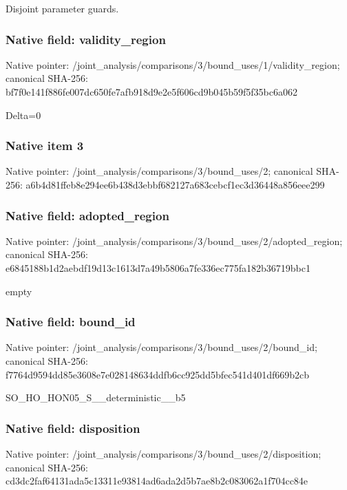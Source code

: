\documentclass[10pt,a4paper]{article}
\begin{document}
\begingroup\raggedright\sloppy Disjoint parameter guards.\par\endgroup

\subsubsection{Native field: validity\_\allowbreak{}region}
Native pointer: /joint\_\allowbreak{}analysis/comparisons/3/bound\_\allowbreak{}uses/1/validity\_\allowbreak{}region; canonical SHA-256: bf7f0e141f886fe007dc650fe7afb918d9e2e5f606cd9b045b59f5f35bc6a062

\begingroup\raggedright\sloppy Delta=\allowbreak{}0\par\endgroup

\subsubsection{Native item 3}
Native pointer: /joint\_\allowbreak{}analysis/comparisons/3/bound\_\allowbreak{}uses/2; canonical SHA-256: a6b4d81ffeb8e294ee6b438d3ebbf682127a683cebcf1ec3d36448a856eee299

\subsubsection{Native field: adopted\_\allowbreak{}region}
Native pointer: /joint\_\allowbreak{}analysis/comparisons/3/bound\_\allowbreak{}uses/2/adopted\_\allowbreak{}region; canonical SHA-256: e6845188b1d2aebdf19d13c1613d7a49b5806a7fe336ec775fa182b36719bbc1

\begingroup\raggedright\sloppy empty\par\endgroup

\subsubsection{Native field: bound\_\allowbreak{}id}
Native pointer: /joint\_\allowbreak{}analysis/comparisons/3/bound\_\allowbreak{}uses/2/bound\_\allowbreak{}id; canonical SHA-256: f7764d9594dd85e3608e7e028148634ddfb6cc925dd5bfec541d401df669b2cb

\begingroup\raggedright\sloppy SO\_\allowbreak{}HO\_\allowbreak{}HON05\_\allowbreak{}S\_\allowbreak{}\_\allowbreak{}deterministic\_\allowbreak{}\_\allowbreak{}b5\par\endgroup

\subsubsection{Native field: disposition}
Native pointer: /joint\_\allowbreak{}analysis/comparisons/3/bound\_\allowbreak{}uses/2/disposition; canonical SHA-256: cd3dc2faf64131ada5c13311e93814ad6ada2d5b7ae8b2c083062a1f704cc84e
\end{document}

